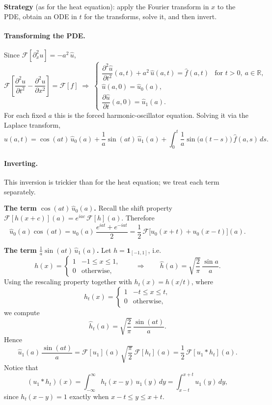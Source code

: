 \textbf{Strategy} (as for the heat equation): apply the Fourier transform in $x$ to the PDE, obtain an ODE in $t$ for the transforms, solve it, and then invert.

\paragraph{Transforming the PDE.}
Since $\mathcal{F}[\partial_x^2 u] = -a^2\,\hat{u}$,
\[
\mathcal{F}\!\left[\frac{\partial^2 u}{\partial t^2} - \frac{\partial^2 u}{\partial x^2}\right] = \mathcal{F}[f]
\;\Longrightarrow\;
\begin{cases}
\dfrac{\partial^2 \hat{u}}{\partial t^2}(a, t) + a^2\,\hat{u}(a, t) = \hat{f}(a, t) & \text{for } t > 0,\ a \in \mathbb{R}, \\[4pt]
\hat{u}(a, 0) = \hat{u}_0(a), \\[2pt]
\dfrac{\partial \hat{u}}{\partial t}(a, 0) = \hat{u}_1(a).
\end{cases}
\]
For each fixed $a$ this is the forced harmonic-oscillator equation. Solving it via the Laplace transform,
\[
\boxed{\hat{u}(a, t) = \cos(at)\,\hat{u}_0(a) + \frac{1}{a}\sin(at)\,\hat{u}_1(a) + \int_0^t \frac{1}{a}\sin\!\bigl(a(t - s)\bigr)\,\hat{f}(a, s)\,ds.}
\]

\paragraph{Inverting.}
This inversion is trickier than for the heat equation; we treat each term separately.

\smallskip
\textbf{The term $\cos(at)\,\hat{u}_0(a)$.}
Recall the shift property $\mathcal{F}[h(x + c)](a) = e^{iac}\,\mathcal{F}[h](a)$. Therefore
\[
\hat{u}_0(a)\cos(at)
= \hat{u}_0(a)\,\frac{e^{iat} + e^{-iat}}{2}
= \frac{1}{2}\,\mathcal{F}\bigl[u_0(x + t) + u_0(x - t)\bigr](a).
\]

\smallskip
\textbf{The term $\tfrac{1}{a}\sin(at)\,\hat{u}_1(a)$.}
Let $h = \mathbf{1}_{[-1, 1]}$, i.e.
\[
h(x) = \begin{cases} 1 & -1 \le x \le 1, \\ 0 & \text{otherwise,}\end{cases}
\qquad\Longrightarrow\qquad
\hat{h}(a) = \sqrt{\frac{2}{\pi}}\,\frac{\sin a}{a}.
\]
Using the rescaling property together with $h_t(x) = h(x/t)$, where
\[
h_t(x) = \begin{cases} 1 & -t \le x \le t, \\ 0 & \text{otherwise,}\end{cases}
\]
we compute
\[
\boxed{\hat{h}_t(a) = \sqrt{\frac{2}{\pi}}\,\frac{\sin(at)}{a}.}
\]
Hence
\[
\hat{u}_1(a)\,\frac{\sin(at)}{a}
= \mathcal{F}[u_1](a)\,\sqrt{\frac{\pi}{2}}\,\mathcal{F}[h_t](a)
= \frac{1}{2}\,\mathcal{F}[u_1 * h_t](a).
\]
Notice that
\[
(u_1 * h_t)(x) = \int_{-\infty}^{\infty} h_t(x - y)\,u_1(y)\,dy = \int_{x - t}^{x + t} u_1(y)\,dy,
\]
since $h_t(x - y) = 1$ exactly when $x - t \le y \le x + t$.

